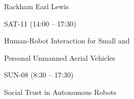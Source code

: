 \documentclass{article}
\begin{document}
\rssheader[2in]

\rssbig
\begin{center}
Rackham Earl Lewis
\end{center}

\vfill

\rssmed
\begin{center}
SAT-11 (14:00 -- 17:30)
\end{center}

\rsssm
\begin{center}
Human-Robot Interaction for Small and \par \noindent Personal Unmanned Aerial
Vehicles
\end{center}

\vfill

\rssmed
\begin{center}
SUN-08 (8:30 -- 17:30)
\end{center}

\rsssm
\begin{center}
Social Trust in Autonomous Robots
\end{center}

\vfill
\end{document}
